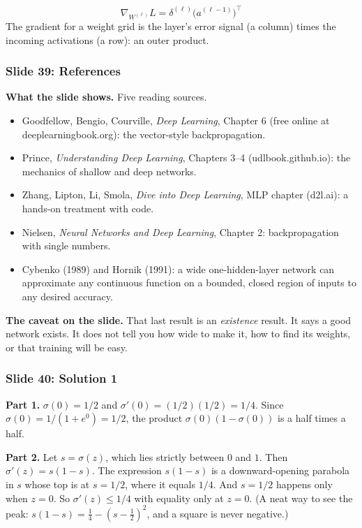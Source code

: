 \[
\nabla_{W^{(\ell)}}L=\delta^{(\ell)}\big(a^{(\ell-1)}\big)^\top
\]
The gradient for a weight grid is the layer's error signal (a column) times the incoming activations (a row): an outer product.

\subsubsection{Slide 39: References}

\textbf{What the slide shows.} Five reading sources.
\begin{itemize}
\item Goodfellow, Bengio, Courville, \emph{Deep Learning}, Chapter 6 (free online at deeplearningbook.org): the vector-style backpropagation.
\item Prince, \emph{Understanding Deep Learning}, Chapters 3--4 (udlbook.github.io): the mechanics of shallow and deep networks.
\item Zhang, Lipton, Li, Smola, \emph{Dive into Deep Learning}, MLP chapter (d2l.ai): a hands-on treatment with code.
\item Nielsen, \emph{Neural Networks and Deep Learning}, Chapter 2: backpropagation with single numbers.
\item Cybenko (1989) and Hornik (1991): a wide one-hidden-layer network can approximate any continuous function on a bounded, closed region of inputs to any desired accuracy.
\end{itemize}
\textbf{The caveat on the slide.} That last result is an \emph{existence} result. It says a good network exists. It does not tell you how wide to make it, how to find its weights, or that training will be easy.

\subsubsection{Slide 40: Solution 1}

\textbf{Part 1.} $\sigma(0)=1/2$ and $\sigma'(0)=(1/2)(1/2)=1/4$. Since $\sigma(0)=1/(1+e^{0})=1/2$, the product $\sigma(0)(1-\sigma(0))$ is a half times a half.

\textbf{Part 2.} Let $s=\sigma(z)$, which lies strictly between $0$ and $1$. Then $\sigma'(z)=s(1-s)$. The expression $s(1-s)$ is a downward-opening parabola in $s$ whose top is at $s=1/2$, where it equals $1/4$. And $s=1/2$ happens only when $z=0$. So $\sigma'(z)\le1/4$ with equality only at $z=0$. (A neat way to see the peak: $s(1-s)=\tfrac14-(s-\tfrac12)^2$, and a square is never negative.)

